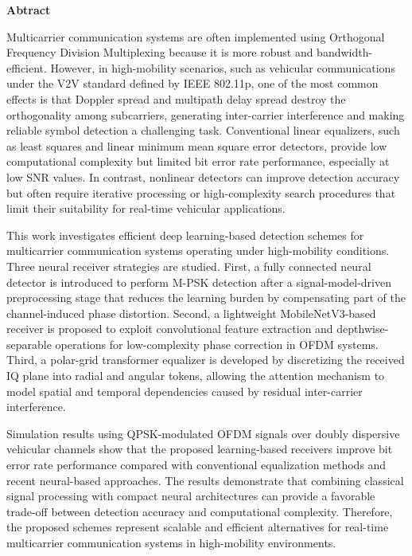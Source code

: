
{\Large{\bf{Abtract}}}

\vspace{2em}

Multicarrier communication systems are often implemented using Orthogonal Frequency Division Multiplexing because it is more robust and bandwidth-efficient. However, in high-mobility scenarios, such as vehicular communications under the V2V standard defined by IEEE 802.11p, one of the most common effects is that Doppler spread and multipath delay spread destroy the orthogonality among subcarriers, generating inter-carrier interference and making reliable symbol detection a challenging task. Conventional linear equalizers, such as least squares and linear minimum mean square error detectors, provide low computational complexity but limited bit error rate performance, especially at low SNR values. In contrast, nonlinear detectors can improve detection accuracy but often require iterative processing or high-complexity search procedures that limit their suitability for real-time vehicular applications.

This work investigates efficient deep learning-based detection schemes for multicarrier communication systems operating under high-mobility conditions. Three neural receiver strategies are studied. First, a fully connected neural detector is introduced to perform M-PSK detection after a signal-model-driven preprocessing stage that reduces the learning burden by compensating part of the channel-induced phase distortion. Second, a lightweight MobileNetV3-based receiver is proposed to exploit convolutional feature extraction and depthwise-separable operations for low-complexity phase correction in OFDM systems. Third, a polar-grid transformer equalizer is developed by discretizing the received IQ plane into radial and angular tokens, allowing the attention mechanism to model spatial and temporal dependencies caused by residual inter-carrier interference.

Simulation results using QPSK-modulated OFDM signals over doubly dispersive vehicular channels show that the proposed learning-based receivers improve bit error rate performance compared with conventional equalization methods and recent neural-based approaches. The results demonstrate that combining classical signal processing with compact neural architectures can provide a favorable trade-off between detection accuracy and computational complexity. Therefore, the proposed schemes represent scalable and efficient alternatives for real-time multicarrier communication systems in high-mobility environments.



\clearpage
